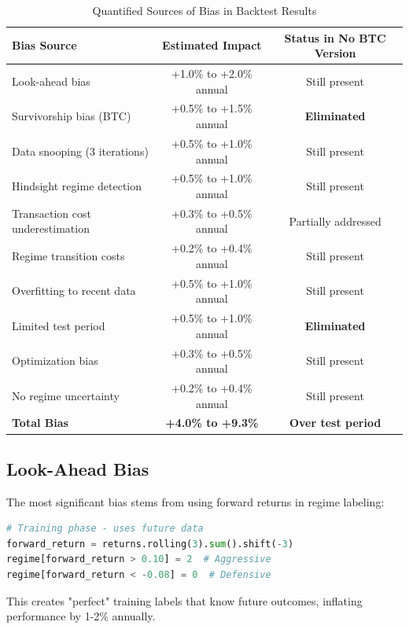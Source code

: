 \documentclass[twocolumn,ieee]{arithmaxresearch}
\begin{document}
\begin{table}[t]
\centering
\caption{Quantified Sources of Bias in Backtest Results}
\label{tab:biases}
\begin{tabular}{lcc}
\toprule
\textbf{Bias Source} & \textbf{Estimated Impact} & \textbf{Status in No BTC Version} \\
\midrule
Look-ahead bias & +1.0\% to +2.0\% annual & Still present \\
Survivorship bias (BTC) & +0.5\% to +1.5\% annual & \textbf{Eliminated} \\
Data snooping (3 iterations) & +0.5\% to +1.0\% annual & Still present \\
Hindsight regime detection & +0.5\% to +1.0\% annual & Still present \\
Transaction cost underestimation & +0.3\% to +0.5\% annual & Partially addressed \\
Regime transition costs & +0.2\% to +0.4\% annual & Still present \\
Overfitting to recent data & +0.5\% to +1.0\% annual & Still present \\
Limited test period & +0.5\% to +1.0\% annual & \textbf{Eliminated} \\
Optimization bias & +0.3\% to +0.5\% annual & Still present \\
No regime uncertainty & +0.2\% to +0.4\% annual & Still present \\
\midrule
\textbf{Total Bias} & \textbf{+4.0\% to +9.3\%} & \textbf{Over test period} \\
\bottomrule
\end{tabular}
\end{table}

\subsection{Look-Ahead Bias}

The most significant bias stems from using forward returns in regime labeling:

\begin{lstlisting}[language=Python, caption=Look-Ahead Bias Example]
# Training phase - uses future data
forward_return = returns.rolling(3).sum().shift(-3)
regime[forward_return > 0.10] = 2  # Aggressive
regime[forward_return < -0.08] = 0  # Defensive
\end{lstlisting}

This creates "perfect" training labels that know future outcomes, inflating performance by 1-2\% annually.
\end{document}
